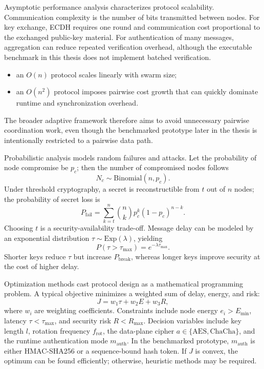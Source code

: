 Asymptotic performance analysis characterizes protocol scalability. Communication complexity is the number of bits transmitted between nodes. For key exchange, ECDH requires one round and communication cost proportional to the exchanged public-key material. For authentication of many messages, aggregation can reduce repeated verification overhead, although the executable benchmark in this thesis does not implement batched verification.
\begin{itemize}
  \item an $O(n)$ protocol scales linearly with swarm size;
  \item an $O(n^2)$ protocol imposes pairwise cost growth that can quickly dominate runtime and synchronization overhead.
\end{itemize}
The broader adaptive framework therefore aims to avoid unnecessary pairwise coordination work, even though the benchmarked prototype later in the thesis is intentionally restricted to a pairwise data path.

Probabilistic analysis models random failures and attacks. Let the probability of node compromise be $p_c$; then the number of compromised nodes follows
\[
N_c \sim \mathrm{Binomial}(n, p_c).
\]
Under threshold cryptography, a secret is reconstructible from $t$ out of $n$ nodes; the probability of secret loss is
\begin{equation}
P_{\text{fail}} = \sum_{k=t}^{n} \binom{n}{k} p_c^k (1-p_c)^{n-k}.
\label{eq:threshold_failure}
\end{equation}
Choosing $t$ is a security-availability trade-off. Message delay can be modeled by an exponential distribution $\tau \sim \mathrm{Exp}(\lambda)$, yielding
\[
P(\tau > \tau_{\max}) = e^{-\lambda \tau_{\max}}.
\]
Shorter keys reduce $\tau$ but increase $P_{\text{break}}$, whereas longer keys improve security at the cost of higher delay.

Optimization methods cast protocol design as a mathematical programming problem. A typical objective minimizes a weighted sum of delay, energy, and risk:
\begin{equation}
J = w_1 \tau + w_2 E + w_3 R,
\label{eq:objective}
\end{equation}
where $w_i$ are weighting coefficients. Constraints include node energy $e_i > E_{\min}$, latency $\tau < \tau_{\max}$, and security risk $R < R_{\max}$. Decision variables include key length $l$, rotation frequency $f_{\mathrm{rot}}$, the data-plane cipher $a \in \{\mathrm{AES}, \mathrm{ChaCha}\}$, and the runtime authentication mode $m_{\mathrm{auth}}$. In the benchmarked prototype, $m_{\mathrm{auth}}$ is either HMAC-SHA256 or a sequence-bound hash token. If $J$ is convex, the optimum can be found efficiently; otherwise, heuristic methods may be required.

